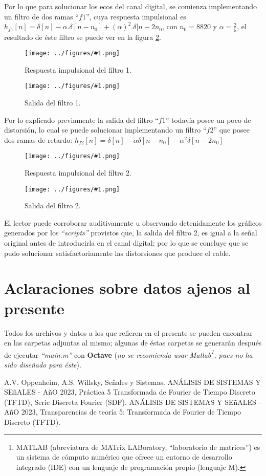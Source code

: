\documentclass[letterpaper, 10 pt, conference]{ieeeconf}  %
\newcommand{\image}[2] {
  \begin{figure}[H]
    \centering
    \texttt{[image: ../figures/\#1.png]}
    \caption{#2}
    \label{fig:#1}
  \end{figure}
}
\begin{document}
Por lo que para solucionar los ecos del canal digital, se comienza implementando un filtro de dos ramas ``$f1$'', cuya respuesta impulsional es $h_{f1}[n]=\delta[n]-\alpha.\delta[n-n_0]+(\alpha)^2.\delta[n-2n_0$, con $n_0=8820$ y $\alpha=\frac{2}{5}$, el resultado de \'este filtro se puede ver en la figura \ref{fig:y-filtro1}.
\image{h-filtro1}{Respuesta impulsional del filtro 1.}
\image{y-filtro1}{Salida del filtro 1.}

Por lo explicado previamente la salida del filtro ``$f1$'' todav\'ia posee un poco de distorsi\'on, lo cual se puede solucionar implementando un filtro ``$f2$'' que posee dos ramas de retardo: $h_{f2}[n] = \delta[n] - \alpha\delta[n-n_0] - \alpha^2\delta[n-2n_0]$ 
\image{h-filtro2}{Respuesta impulsional del filtro 2.}
\image{y-filtro2}{Salida del filtro 2.}

El lector puede corroborar auditivamente u observando detenidamente los gr\'aficos generados por los \textit{``scripts''} provistos que, la salida del filtro 2, es igual a la se\~nal original antes de introducirla en el canal digital; por lo que se concluye que se pudo solucionar satisfactoriamente las distorsiones que produce el cable.

\section{Aclaraciones sobre datos ajenos al presente}
Todos los archivos y datos a los que refieren en el presente se pueden encontrar en las carpetas adjuntas al mismo; algunas de \'estas carpetas se generar\'an despu\'es de ejecutar \textit{``main.m''} con \textbf{Octave} (\textit{no se recomienda usar Matlab\footnote{MATLAB (abreviatura de MATrix LABoratory, ``laboratorio de matrices'') es un sistema de c\'omputo num\'erico que ofrece un entorno de desarrollo integrado (IDE) con un lenguaje de programaci\'on propio (lenguaje M).}, pues no ha sido dise\~nado para \'este}).

\begin{thebibliography}{99}
  
A.V. Oppenheim, A.S. Willsky, Se\~nales y Sistemas.
ANÁLISIS DE SISTEMAS Y SE\~{n}ALES - A\~{n}O 2023, Práctica 5 Transformada de Fourier de Tiempo Discreto (TFTD), Serie Discreta Fourier (SDF).
ANÁLISIS DE SISTEMAS Y SE\~{n}ALES - A\~{n}O 2023, Transparencias de teor\'ia 5: Transformada de Fourier de Tiempo Discreto (TFTD).

\end{thebibliography}
\end{document}

